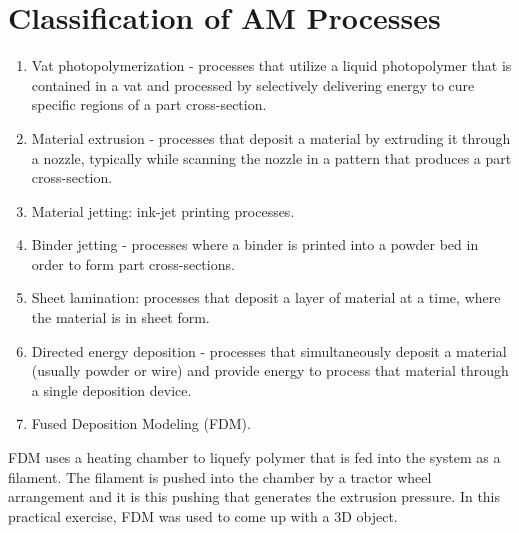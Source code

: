 \section{Classification of AM Processes}
\begin{enumerate}
\item Vat photopolymerization - processes that utilize a liquid photopolymer that is
contained in a vat and processed by selectively delivering energy to cure specific
regions of a part cross-section.
\item Material extrusion - processes that deposit a material by extruding it through a
nozzle, typically while scanning the nozzle in a pattern that produces a part
cross-section.
\item Material jetting: ink-jet printing processes.
\item Binder jetting - processes where a binder is printed into a powder bed in order to
form part cross-sections.
\item Sheet lamination: processes that deposit a layer of material at a time, where the
material is in sheet form.
\item Directed energy deposition - processes that simultaneously deposit a material
(usually powder or wire) and provide energy to process that material through a
single deposition device.
\item Fused Deposition Modeling (FDM).
\end{enumerate}
FDM uses a
heating chamber to liquefy polymer that is fed into the system as a filament. The filament is pushed into the chamber by a tractor wheel arrangement and it is this
pushing that generates the extrusion pressure. In this practical exercise, FDM was used to come up with a 3D object.

